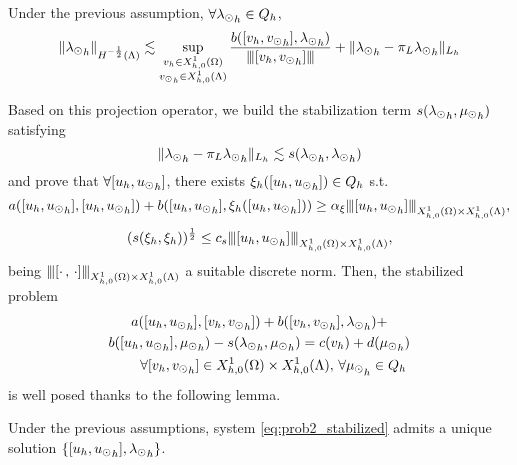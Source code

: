 \begin{lemma}\cite[Lemma2.1]{burman2014}
Under the previous assumption, $\forall {\lambda_{\odot}}_h \in Q_h$,
\begin{equation*}
\|{\lambda_{\odot}}_h\|_{H^{-\frac 12}(\Lambda)} \lesssim \sup_{\substack{v_h \in X_{h,0}^1(\Omega)\\ {v_{\odot}}_h \in X_{h,0}^1(\Lambda)}} \frac{b([v_h, {v_{\odot}}_h], {\lambda_{\odot}}_h)}{{\left\vert\kern-0.25ex\left\vert\kern-0.25ex\left\vert [v_h, {v_{\odot}}_h] \right\vert\kern-0.25ex\right\vert\kern-0.25ex\right\vert}} + \|{\lambda_{\odot}}_h - \pi_L {\lambda_{\odot}}_h\|_{L_h}
\end{equation*}
\end{lemma}
 Based on this projection operator, we build the stabilization term $s({\lambda_{\odot}}_h, {\mu_{\odot}}_h)$ satisfying
 \begin{equation*}
 \|{\lambda_{\odot}}_h- \pi_L {\lambda_{\odot}}_h\|_{L_h} \lesssim s({\lambda_{\odot}}_h, {\lambda_{\odot}}_h)
\end{equation*}  and prove that $\forall [u_h, {u_{\odot}}_h]$, there exists $\xi_h([u_h, {u_{\odot}}_h]) \in Q_h$ s.t.
\begin{equation}\label{stab_coercivity}
a([u_h, {\ud}_h],[u_h, {\ud}_h] ) + b([u_h, {\ud}_h], \xi_h([u_h, {\ud}_h])) \geq \alpha_\xi \vertiii{[u_h, {\ud}_h]}_{X_{h,0}^1(\Omega)\times X_{h,0}^1(\Lambda) },
\end{equation}
\begin{equation}\label{stab_stability}
(s(\xi_{h}, \xi_{h}))^{\frac 12} \leq c_s \vertiii{[u_h, {\ud}_h]}_{X_{h,0}^1(\Omega)\times X_{h,0}^1(\Lambda) },
\end{equation}
being ${\left\vert\kern-0.25ex\left\vert\kern-0.25ex\left\vert [\cdot \, ,\, \cdot]  \right\vert\kern-0.25ex\right\vert\kern-0.25ex\right\vert}_{X_{h,0}^1(\Omega)\times X_{h,0}^1(\Lambda) }$ a suitable discrete norm. Then, the stabilized problem 
\begin{multline}\label{eq:prob2_stabilized}
a([u_h, {\ud}_h], [v_h, {\vd}_h]) +
b([v_h, {\vd}_h], {\ld}_h) +\\
b([u_h, {\ud}_h], {\md}_h) 
- s({\ld}_h, {\md}_h) = c(v_h) + d({\md}_h)\\
  \qquad \forall [v_h, {\vd}_h] \in {X_{h,0}^1(\Omega)\times X_{h,0}^1(\Lambda), \, \forall \md}_h \in Q_h
\end{multline}
is well posed thanks to the following lemma.
\begin{lemma}\cite[Lemma2.3]{burman2014}
Under the previous assumptions, system \eqref{eq:prob2_stabilized} admits a unique solution $\{[u_h, {u_{\odot}}_h], {\lambda_{\odot}}_h \}$.
\end{lemma}


